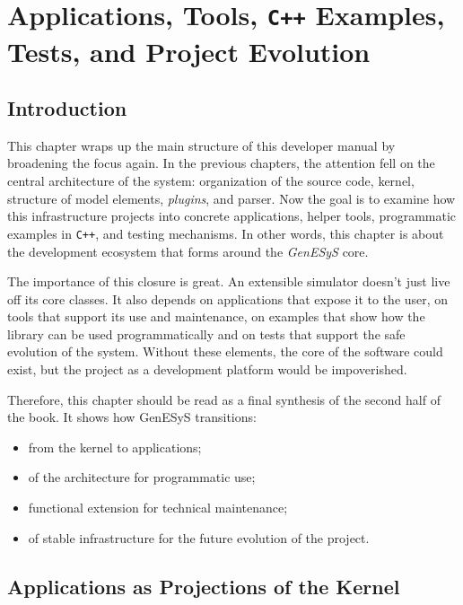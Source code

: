 \chapter{Applications, Tools, \texttt{C++} Examples, Tests, and Project Evolution}
\label{chap:applications_tools_exemplos_testes_evolucao}

\section{Introduction}
\label{sec:cap10_introducao}

This chapter wraps up the main structure of this developer manual by broadening the focus again. In the previous chapters, the attention fell on the central architecture of the system: organization of the source code, kernel, structure of model elements, \textit{plugins}, and parser. Now the goal is to examine how this infrastructure projects into concrete applications, helper tools, programmatic examples in \texttt{C++}, and testing mechanisms. In other words, this chapter is about the development ecosystem that forms around the \textit{GenESyS} core.

The importance of this closure is great. An extensible simulator doesn't just live off its core classes. It also depends on applications that expose it to the user, on tools that support its use and maintenance, on examples that show how the library can be used programmatically and on tests that support the safe evolution of the system. Without these elements, the core of the software could exist, but the project as a development platform would be impoverished.

Therefore, this chapter should be read as a final synthesis of the second half of the book. It shows how GenESyS transitions:
\begin{itemize}
 \item from the kernel to applications;
 \item of the architecture for programmatic use;
 \item functional extension for technical maintenance;
 \item of stable infrastructure for the future evolution of the project.
\end{itemize}

\section{Applications as Projections of the Kernel}
\label{sec:cap10_applications_como_projecoes_kernel}

